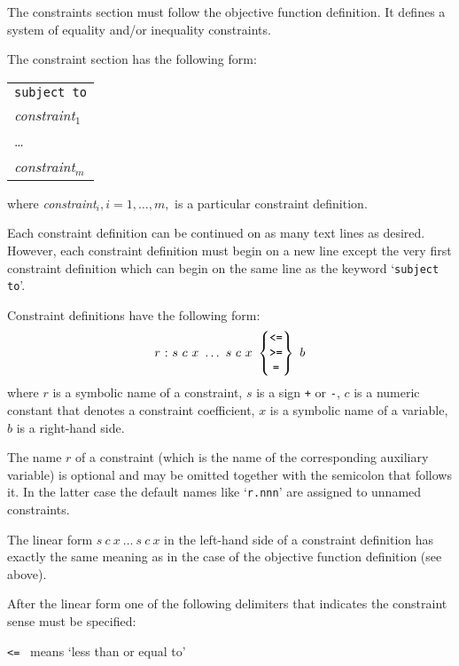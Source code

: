 The constraints section must follow the objective function definition.
It defines a system of equality and/or inequality constraints.

The constraint section has the following form:

\begin{center}
\begin{tabular}{l}
\verb|subject to| \\
{\it constraint}$_1$ \\
\hspace{20pt}\dots \\
{\it constraint}$_m$ \\
\end{tabular}
\end{center}

\noindent where {\it constraint}$_i, i=1,\dots,m,$ is a particular
constraint definition.

Each constraint definition can be continued on as many text lines as
desired. However, each constraint definition must begin on a new line
except the very first constraint definition which can begin on the same
line as the keyword `\verb|subject to|'.

Constraint definitions have the following form:
$$
r\ {\tt:}\ s\ c\ x\ \dots\ s\ c\ x
\ \left\{
\begin{array}{@{}c@{}}
\mbox{\tt<=} \\ \mbox{\tt>=} \\ \mbox{\tt=}
\end{array}
\right\}\ b
$$
where $r$ is a symbolic name of a constraint, $s$ is a sign \verb|+| or
\verb|-|, $c$ is a numeric constant that denotes a constraint
coefficient, $x$ is a symbolic name of a variable, $b$ is a right-hand
side.

The name $r$ of a constraint (which is the name of the corresponding
auxiliary variable) is optional and may be omitted together with the
semicolon that follows it. In the latter case the default names like
`\verb|r.nnn|' are assigned to unnamed constraints.

The linear form $s\ c\ x\ \dots\ s\ c\ x$ in the left-hand side of
a constraint definition has exactly the same meaning as in the case of
the objective function definition (see above).

After the linear form one of the following delimiters that indicates
the constraint sense must be specified:

\verb|<=| \ means `less than or equal to'

